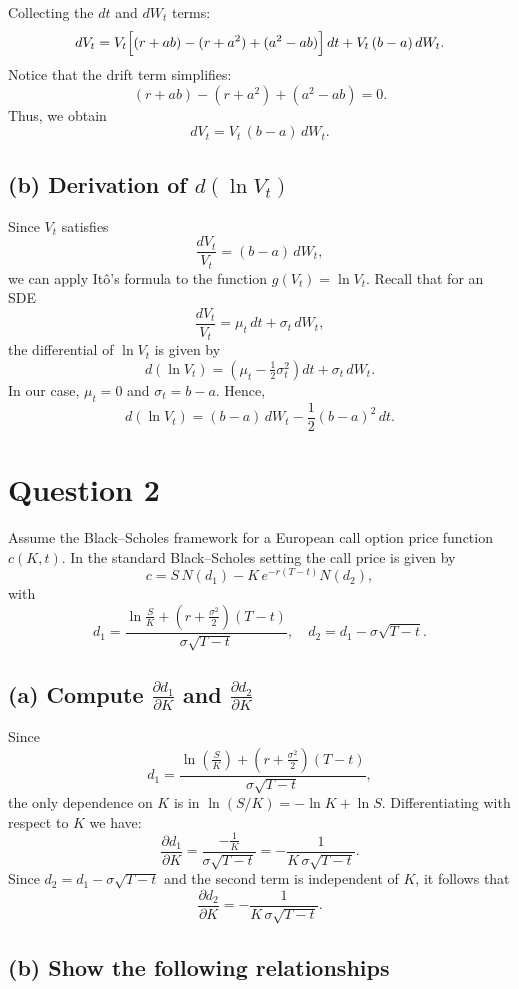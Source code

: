 \documentclass[12pt]{article}
\begin{document}
Collecting the \(dt\) and \(dW_t\) terms:
\[
dV_t = V_t\Bigl[(r+ab) - (r+a^2) + (a^2-ab)\Bigr]\,dt + V_t\,(b-a)\,dW_t.
\]
Notice that the drift term simplifies:
\[
(r+ab) - (r+a^2) + (a^2-ab) = 0.
\]
Thus, we obtain
\[
\boxed{dV_t = V_t\,(b-a)\,dW_t.}
\]

\subsection*{(b) Derivation of \(d(\ln V_t)\)}

Since \(V_t\) satisfies
\[
\frac{dV_t}{V_t} = (b-a)\,dW_t,
\]
we can apply It\^o’s formula to the function \(g(V_t)=\ln V_t\). Recall that for an SDE
\[
\frac{dV_t}{V_t} = \mu_t\,dt + \sigma_t\,dW_t,
\]
the differential of \(\ln V_t\) is given by
\[
d(\ln V_t) = \left(\mu_t - \tfrac{1}{2}\sigma_t^2\right)dt + \sigma_t\,dW_t.
\]
In our case, \(\mu_t=0\) and \(\sigma_t=b-a\). Hence,
\[
\boxed{d(\ln V_t) = (b-a)\,dW_t - \frac{1}{2}(b-a)^2\,dt.}
\]

\section*{Question 2}

Assume the Black--Scholes framework for a European call option price function \(c(K,t)\). In the standard Black--Scholes setting the call price is given by
\[
c = S\,N(d_1) - K\,e^{-r(T-t)}N(d_2),
\]
with
\[
d_1 = \frac{\ln\frac{S}{K}+(r+\tfrac{\sigma^2}{2})(T-t)}{\sigma\sqrt{T-t}},\quad d_2 = d_1-\sigma\sqrt{T-t}.
\]

\subsection*{(a) Compute \(\frac{\partial d_1}{\partial K}\) and \(\frac{\partial d_2}{\partial K}\)}

Since
\[
d_1 = \frac{\ln\left(\frac{S}{K}\right)+(r+\frac{\sigma^2}{2})(T-t)}{\sigma\sqrt{T-t}},
\]
the only dependence on \(K\) is in \(\ln(S/K)=-\ln K+\ln S\). Differentiating with respect to \(K\) we have:
\[
\frac{\partial d_1}{\partial K} = \frac{-\frac{1}{K}}{\sigma\sqrt{T-t}} = -\frac{1}{K\,\sigma\sqrt{T-t}}.
\]
Since \(d_2 = d_1-\sigma\sqrt{T-t}\) and the second term is independent of \(K\), it follows that
\[
\boxed{\frac{\partial d_2}{\partial K} = -\frac{1}{K\,\sigma\sqrt{T-t}}.}
\]

\subsection*{(b) Show the following relationships}
\end{document}
